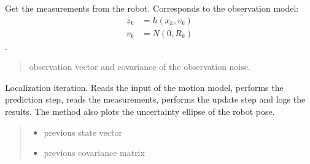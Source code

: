 \documentclass[letterpaper,10pt,english]{sphinxmanual}
\begin{document}
\begin{fulllineitems}
\begin{fulllineitems}
\label{\detokenize{GFLocalization:GFLocalization.GFLocalization.GetMeasurements}}
\pysigstartsignatures
{}
\pysigstopsignatures
\sphinxAtStartPar
Get the measurements from the robot. Corresponds to the observation model:
\begin{equation}\label{equation:GFLocalization:eq-h}
\begin{split}z_k &= h(x_{k},v_k) \\
v_k &= N(0,R_k)\end{split}
\end{equation}
\sphinxAtStartPar
{} .
\begin{quote}\begin{description}
\sphinxAtStartPar
observation vector and covariance of the observation noise.

\end{description}\end{quote}

\end{fulllineitems}


\begin{fulllineitems}
\label{\detokenize{GFLocalization:GFLocalization.GFLocalization.Localize}}
\pysigstartsignatures
{}
\pysigstopsignatures
\sphinxAtStartPar
Localization iteration. Reads the input of the motion model, performs the prediction step, reads the measurements, performs the update step and logs the results.
The method also plots the uncertainty ellipse of the robot pose.
\begin{quote}\begin{description}
\begin{itemize}
\item {} 
\sphinxAtStartPar
{} \textendash{} previous state vector

\item {} 
\sphinxAtStartPar
{} \textendash{} previous covariance matrix


\end{itemize}
\end{description}
\end{quote}
\end{fulllineitems}
\end{fulllineitems}
\end{document}
